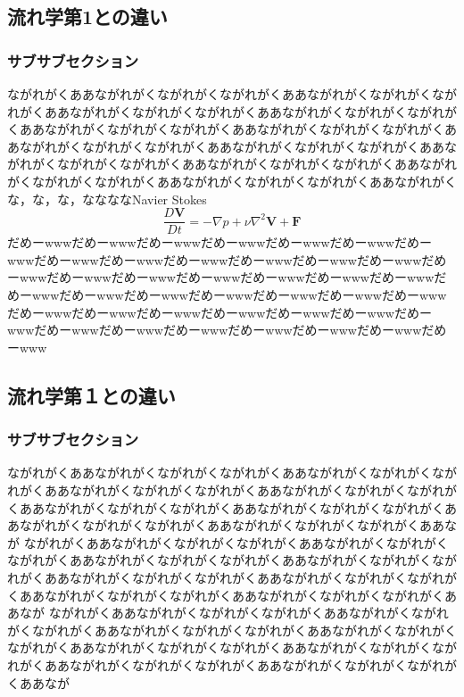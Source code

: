 \documentclass[uplatex,12pt]{jsbook}
\begin{document}
	\subsection{流れ学第1との違い}
	\subsubsection{サブサブセクション}
	ながれがくああながれがくながれがくながれがくああながれがくながれがくながれがくああながれがくながれがくながれがくああながれがくながれがくながれがくああながれがくながれがくながれがくああながれがくながれがくながれがくああながれがくながれがくながれがくああながれがくながれがくながれがくああながれがくながれがくながれがくああながれがくながれがくながれがくああながれがくながれがくながれがくああながれがくながれがくながれがくああながれがくな，な，な，ななななNavier Stokes
	\[
		\frac{D\bm{V}}{Dt} = -\nabla p + \nu\nabla^2\bm{V} + \bm{F}
	\]だめーwwwだめーwwwだめーwwwだめーwwwだめーwwwだめーwwwだめーwwwだめーwwwだめーwwwだめーwwwだめーwwwだめーwwwだめーwwwだめーwwwだめーwwwだめーwwwだめーwwwだめーwwwだめーwwwだめーwwwだめーwwwだめーwwwだめーwwwだめーwwwだめーwwwだめーwwwだめーwwwだめーwwwだめーwwwだめーwwwだめーwwwだめーwwwだめーwwwだめーwwwだめーwwwだめーwwwだめーwwwだめーwwwだめーwwwだめーwwwだめーwww
	\subsection{流れ学第１との違い}
	\subsubsection{サブサブセクション}
	ながれがくああながれがくながれがくながれがくああながれがくながれがくながれがくああながれがくながれがくながれがくああながれがくながれがくながれがくああながれがくながれがくながれがくああながれがくながれがくながれがくああながれがくながれがくながれがくああながれがくながれがくながれがくああなが
	ながれがくああながれがくながれがくながれがくああながれがくながれがくながれがくああながれがくながれがくながれがくああながれがくながれがくながれがくああながれがくながれがくながれがくああながれがくながれがくながれがくああながれがくながれがくながれがくああながれがくながれがくながれがくああなが
	ながれがくああながれがくながれがくながれがくああながれがくながれがくながれがくああながれがくながれがくながれがくああながれがくながれがくながれがくああながれがくながれがくながれがくああながれがくながれがくながれがくああながれがくながれがくながれがくああながれがくながれがくながれがくああなが


\printindex
\end{document}
